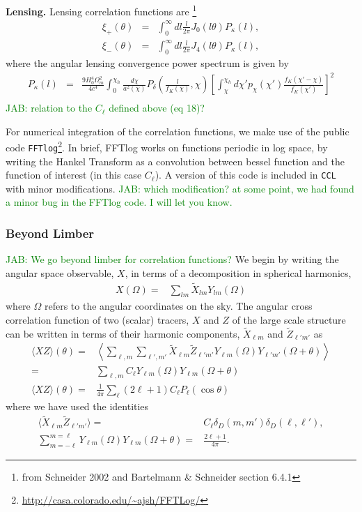 \documentclass[\docopts]{\docclass}
\newcommand{\jab}[1]{\textcolor{green}{JAB: #1}}
\begin{document}
{\bf Lensing.} Lensing correlation functions are \footnote{from Schneider 2002 and Bartelmann \& Schneider section 6.4.1}
%
\begin{eqnarray}
\xi_{+}(\theta)&=&\int_0^{\infty}dl\frac{l}{2\pi}J_0(l\theta)P_\kappa(l),\\
\xi_{-}(\theta)&=&\int_0^{\infty}dl\frac{l}{2\pi}J_4(l\theta)P_\kappa(l),
\label{eq:xipxim}
\end{eqnarray}
%
where the angular lensing convergence power spectrum is given by
\begin{eqnarray}
P_\kappa(l) &=& \frac{9H_0^4\Omega_m^2}{4c^4}\int_{0}^{\chi_h}\frac{d\chi}{a^2(\chi)}P_\delta\left(\frac{l}{f_K(\chi)},\chi\right)\left[\int_\chi^{\chi_h}d\chi'p_\chi(\chi')\frac{f_K(\chi'-\chi)}{f_K(\chi')}\right]^2\\
\end{eqnarray}
\jab{relation to the $C_\ell$ defined above (eq 18)?}

For numerical integration of the correlation functions, we make use of the public code {\tt FFTlog}\footnote{\url{http://casa.colorado.edu/~ajsh/FFTLog/}}\citep{Hamilton2000,Talman2009}. In brief, FFTlog works on functions periodic in log space, by writing the Hankel Transform as a convolution between bessel function and the function of interest (in this case $C_\ell$). A version of this code is included in {\tt CCL} with minor modifications. \jab{which modification? at some point, we had found a minor bug in the FFTlog code. I will let you know.}

\subsubsection{Beyond Limber}

\jab{We go beyond limber for correlation functions?}
We begin by writing the angular space observable, $X$, in terms of a decomposition in spherical harmonics, 
\begin{align}\label{eq:X_harmonic}
  X(\Omega)=&\sum_{lm}\tilde X_{lm}Y_{lm}(\Omega)
\end{align}
where $\Omega$ refers to the angular coordinates on the sky.
The angular cross correlation function of two (scalar) tracers, $X$ and $Z$ of the large scale structure can be written in terms of their harmonic components, $\tilde X_{\ell m}$ and $\tilde Z_{\ell' m'}$ as
\begin{align}
  \langle XZ \rangle(\theta)=&\left\langle\sum_{\ell,m}\sum_{\ell', m'}\tilde X_{\ell m}\tilde Z_{\ell' m'}
  Y_{\ell m}(\Omega)
  Y_{\ell'm'}(\Omega+\theta)\right\rangle\\
  =&\sum_{\ell,m}C_{\ell}Y_{\ell m}(\Omega)
  Y_{\ell m}(\Omega+\theta)\\
  \langle XZ \rangle(\theta)=&\frac{1}{4\pi}\sum_{\ell}(2\ell+1)C_{\ell}P_{\ell}(\cos\theta)\label{eq:xi_pl0}
\end{align}
where we have used the identities
\begin{align}
  \langle\tilde X_{\ell m}\tilde Z_{\ell' m'}\rangle=&C_{\ell}\delta_D(m,m')\delta_D(\ell,\ell'),\\
  \sum_{m=-\ell}^{m=\ell}Y_{\ell m}(\Omega)Y_{\ell m}(\Omega+\theta)=&\frac{2\ell+1}{4\pi}\label{eq:Ylm_Pl}.
\end{align}
\end{document}
